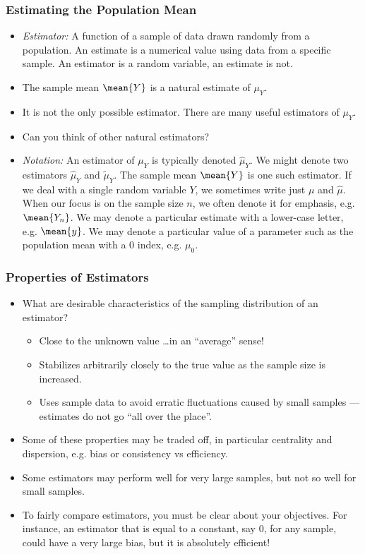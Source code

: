 

\begin{frame}
\frametitle{Estimating the Population Mean}
\begin{itemize}
\item \emph{Estimator:} A function of a sample of data drawn randomly from a population. An estimate is a numerical value using data from a specific sample. An estimator is a random variable, an estimate is not.
\item The sample mean $\mean{Y}$ is a natural estimate of $\mu_{Y}$. 
\item It is not the only possible estimator. There are many useful estimators of $\mu_{Y}$. 
\item {} Can you think of other natural estimators?
\item \emph{Notation:} An estimator of $\mu_Y$ is typically denoted $\hat{\mu}_Y$. We might denote two estimators $\hat{\mu}_Y$ and $\tilde{\mu}_Y$. The sample mean $\mean{Y}$ is one such estimator. If we deal with a single random variable $Y$, we sometimes write just $\mu$ and $\hat{\mu}$. When our focus is on the sample size $n$, we often denote it for emphasis, e.g. $\mean{Y_n}$. We may denote a particular estimate with a lower-case letter, e.g. $\mean{y}$. We may denote a particular value of a parameter such as the population mean with a $0$ index, e.g. $\mu_0$.
\end{itemize}
\end{frame}


\begin{frame}
\frametitle{Properties of Estimators}
\begin{itemize}
\item What are desirable characteristics of the sampling distribution of an estimator? 
\begin{itemize}
\item Close to the unknown value \ldots in an ``average'' sense!
\item Stabilizes arbitrarily closely to the true value as the sample size is increased.
\item Uses sample data to avoid erratic fluctuations caused by small samples --- estimates do not go ``all over the place''.
\end{itemize}
\item Some of these properties may be traded off, in particular centrality and dispersion, e.g. bias or consistency vs efficiency. 
\item Some estimators may perform well for very large samples, but not so well for small samples. 
\item To fairly compare estimators, you must be clear about your objectives. For instance, an estimator that is equal to a constant, say $0$, for any sample, could have a very large bias, but it is absolutely efficient!
\end{itemize}
\end{frame}


